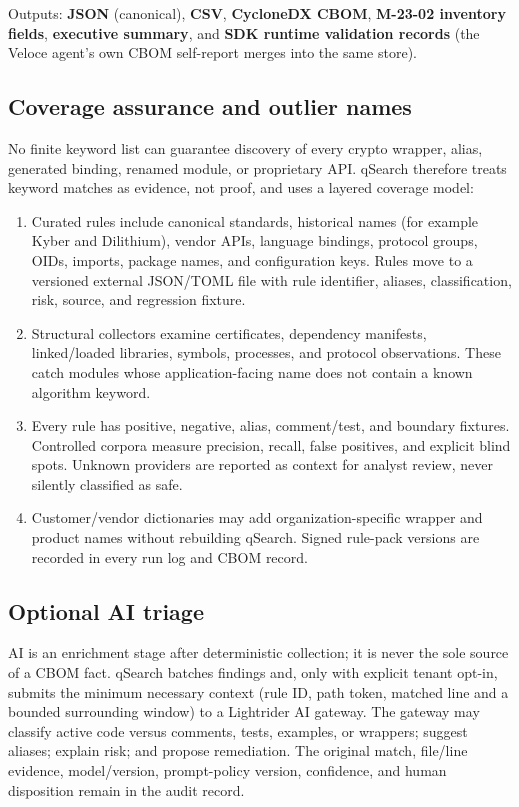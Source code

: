 \documentclass[10pt]{article}
\begin{document}
Outputs: \textbf{JSON} (canonical), \textbf{CSV}, \textbf{CycloneDX CBOM},
\textbf{M-23-02 inventory fields}, \textbf{executive summary}, and \textbf{SDK runtime
validation records} (the Veloce agent's own CBOM self-report merges into the same store).

\subsection{Coverage assurance and outlier names}
No finite keyword list can guarantee discovery of every crypto wrapper, alias, generated
binding, renamed module, or proprietary API. qSearch therefore treats keyword matches as
evidence, not proof, and uses a layered coverage model:
\begin{enumerate}
  \item Curated rules include canonical standards, historical names (for example Kyber
        and Dilithium), vendor APIs, language bindings, protocol groups, OIDs, imports,
        package names, and configuration keys. Rules move to a versioned external
        JSON/TOML file with rule identifier, aliases, classification, risk, source, and
        regression fixture.
  \item Structural collectors examine certificates, dependency manifests, linked/loaded
        libraries, symbols, processes, and protocol observations. These catch modules
        whose application-facing name does not contain a known algorithm keyword.
  \item Every rule has positive, negative, alias, comment/test, and boundary fixtures.
        Controlled corpora measure precision, recall, false positives, and explicit blind
        spots. Unknown providers are reported as context for analyst review, never silently
        classified as safe.
  \item Customer/vendor dictionaries may add organization-specific wrapper and product
        names without rebuilding qSearch. Signed rule-pack versions are recorded in every
        run log and CBOM record.
\end{enumerate}

\subsection{Optional AI triage}
AI is an enrichment stage after deterministic collection; it is never the sole source of
a CBOM fact. qSearch batches findings and, only with explicit tenant opt-in, submits the
minimum necessary context (rule ID, path token, matched line and a bounded surrounding
window) to a Lightrider AI gateway. The gateway may classify active code versus comments,
tests, examples, or wrappers; suggest aliases; explain risk; and propose remediation. The
original match, file/line evidence, model/version, prompt-policy version, confidence, and
human disposition remain in the audit record.
\end{document}
